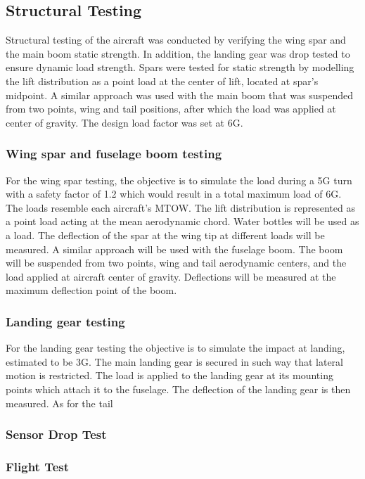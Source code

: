 \subsection{Structural Testing}
Structural testing of the aircraft was conducted by verifying the wing spar and the main boom static strength. In addition, the landing gear was drop tested to ensure dynamic load strength. Spars were tested for static strength by modelling the lift distribution as a point load at the center of lift,  located at spar's midpoint. A similar approach was used with the main boom that was suspended from two points, wing and tail positions, after which the load was applied at center of gravity. The design load factor was set at 6G. 

\subsubsection{Wing spar and fuselage boom testing}
For the wing spar testing, the objective is to simulate the load during a 5G turn with a safety factor of 1.2 which would result in a total maximum load of 6G. The loads resemble each aircraft's MTOW. The lift distribution is represented as a point load acting at the mean aerodynamic chord. Water bottles will be used as a load. The deflection of the spar at the wing tip at different loads will be measured. A similar approach will be used with the fuselage boom. The boom will be suspended from two points, wing and tail aerodynamic centers, and the load applied at aircraft center of gravity. Deflections will be measured at the maximum deflection point of the boom.

\subsubsection{Landing gear testing}
For the landing gear testing the objective is to simulate the impact at landing, estimated to be 3G. The main landing gear is secured in such way that lateral motion is restricted. The load is applied to the landing gear at its mounting points which attach it to the fuselage. The deflection of the landing gear is then measured. As for the tail

\subsubsection{Sensor Drop Test}

\subsubsection{Flight Test}

